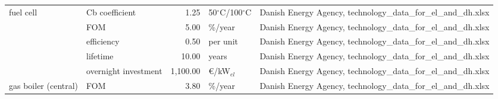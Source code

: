\begin{longtable}{p{4cm}p{4cm}rp{3cm}p{10cm}}
fuel cell & Cb coefficient &         1.25 &  50$^{\circ}$C/100$^{\circ}$C &                                                                                                                                                                                                                                                                        Danish Energy Agency, technology\_data\_for\_el\_and\_dh.xlsx \\
                      & FOM &         5.00 &                       \%/year &                                                                                                                                                                                                                                                                        Danish Energy Agency, technology\_data\_for\_el\_and\_dh.xlsx \\
                      & efficiency &         0.50 &                      per unit &                                                                                                                                                                                                                                                                        Danish Energy Agency, technology\_data\_for\_el\_and\_dh.xlsx \\
                      & lifetime &        10.00 &                         years &                                                                                                                                                                                                                                                                        Danish Energy Agency, technology\_data\_for\_el\_and\_dh.xlsx \\
                      & overnight investment &     1,100.00 &               \euro/kW$_{el}$ &                                                                                                                                                                                                                                                                        Danish Energy Agency, technology\_data\_for\_el\_and\_dh.xlsx \\
gas boiler (central) & FOM &         3.80 &                       \%/year &                                                                                                                                                                                                                                                                        Danish Energy Agency, technology\_data\_for\_el\_and\_dh.xlsx \\

\end{longtable}
